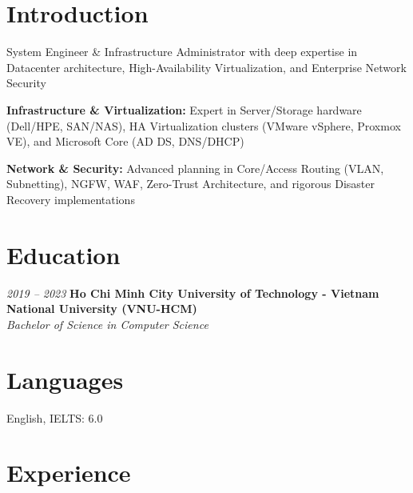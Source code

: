 \section{Introduction}
\begin{onecolentry}
    \begin{highlights}
        \item System Engineer \& Infrastructure Administrator with deep expertise in Datacenter architecture, High-Availability Virtualization, and Enterprise Network Security
        \item \textbf{Infrastructure \& Virtualization:} Expert in Server/Storage hardware (Dell/HPE, SAN/NAS), HA Virtualization clusters (VMware vSphere, Proxmox VE), and Microsoft Core (AD DS, DNS/DHCP)
        \item \textbf{Network \& Security:} Advanced planning in Core/Access Routing (VLAN, Subnetting), NGFW, WAF, Zero-Trust Architecture, and rigorous Disaster Recovery implementations
    \end{highlights}
\end{onecolentry}

\section{Education}
\begin{twocolentry}{\textit{2019 -- 2023}}
    \textbf{Ho Chi Minh City University of Technology - Vietnam National University (VNU-HCM)}\\[4pt]
    \textit{Bachelor of Science in Computer Science}
\end{twocolentry}

\section{Languages}
\begin{onecolentry}
    \begin{highlights}
        \item English, IELTS: 6.0
    \end{highlights}
\end{onecolentry}

\section{Experience}


